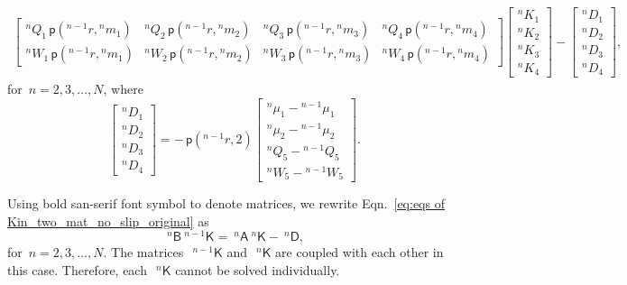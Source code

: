 \documentclass[preprint,10pt,times]{elsarticle}
\numberwithin{equation}{section}
\renewcommand{\u}[1]{\boldsymbol{#1}}
\newcommand{\usf}[1]{\u{\mathsf #1}}
\newcommand{\pr}[1]{\left( #1 \right)}
\newcommand{\p}{\,\mathsf{p}}
\renewcommand{\>}{$\Rightarrow$}
\begin{document}
\begin{equation}
\begin{aligned}
\begin{bmatrix}
	{}^{n}\!{Q_{1}} \p\pr{{}^{n-1}\!{r},{}^{n}\!{m_{1}}} & {}^{n}\!{Q_{2}} \p\pr{{}^{n-1}\!{r},{}^{n}\!{m_{2}}} & {}^{n}\!{Q_{3}} \p\pr{{}^{n-1}\!{r},{}^{n}\!{m_{3}}} & {}^{n}\!{Q_{4}} \p\pr{{}^{n-1}\!{r},{}^{n}\!{m_{4}}} \\
	{}^{n}\!{W_{1}} \p\pr{{}^{n-1}\!{r},{}^{n}\!{m_{1}}} & {}^{n}\!{W_{2}} \p\pr{{}^{n-1}\!{r},{}^{n}\!{m_{2}}} & {}^{n}\!{W_{3}} \p\pr{{}^{n-1}\!{r},{}^{n}\!{m_{3}}} & {}^{n}\!{W_{4}} \p\pr{{}^{n-1}\!{r},{}^{n}\!{m_{4}}}
  \end{bmatrix}
  \begin{bmatrix}
	{}^{n}\!{K_{1}} \\ {}^{n}\!{K_{2}} \\ {}^{n}\!{K_{3}} \\ {}^{n}\!{K_{4}}
  \end{bmatrix}
-
\begin{bmatrix}
	{}^{n}\!{D_{1}} \\ {}^{n}\!{D_{2}} \\ {}^{n}\!{D_{3}} \\ {}^{n}\!{D_{4}}
\end{bmatrix},
\label{eq:eqs of Kin_two_mat_no_slip_original}
\end{aligned}
\end{equation}
for~$n = 2,3,\dots,N$, where
\begin{equation}
	\begin{bmatrix}
		{}^{n}\!{D_{1}} \\ {}^{n}\!{D_{2}} \\ {}^{n}\!{D_{3}} \\ {}^{n}\!{D_{4}}
	\end{bmatrix}
	= - \p\pr{{}^{n-1}\!{r},2}
	\begin{bmatrix}
		{}^{n}\!{\mu_{1}}-{}^{n-1}\!{\mu_{1}} \\ {}^{n}\!{\mu_{2}}-{}^{n-1}\!{\mu_{2}}  \\ {}^{n}\!{Q_{5}}-{}^{n-1}\!{Q_{5}} \\ {}^{n}\!{W_{5}}-{}^{n-1}\!{W_{5}}
	\end{bmatrix}.
\end{equation}

Using bold san-serif font symbol to denote matrices, we rewrite Eqn.~\eqref{eq:eqs of Kin_two_mat_no_slip_original} as
\begin{equation}
	~^{n}{\usf{B}} ~^{n-1}{\usf{K}} = ~^{n}{\usf{A}} ~^{n}{\usf{K}} - ~^{n}{\usf{D}},
	\label{eq:eqs of Kin_two_mat_no_slip_np1}
\end{equation}
for~$n = 2,3,\dots,N$. The matrices~$~^{{n-1}}{\usf{K}}$ and~$~^{n}{\usf{K}}$ are coupled with each other in this case. Therefore, each~$~^{n}{\usf{K}}$ cannot be solved individually.
\end{document}
